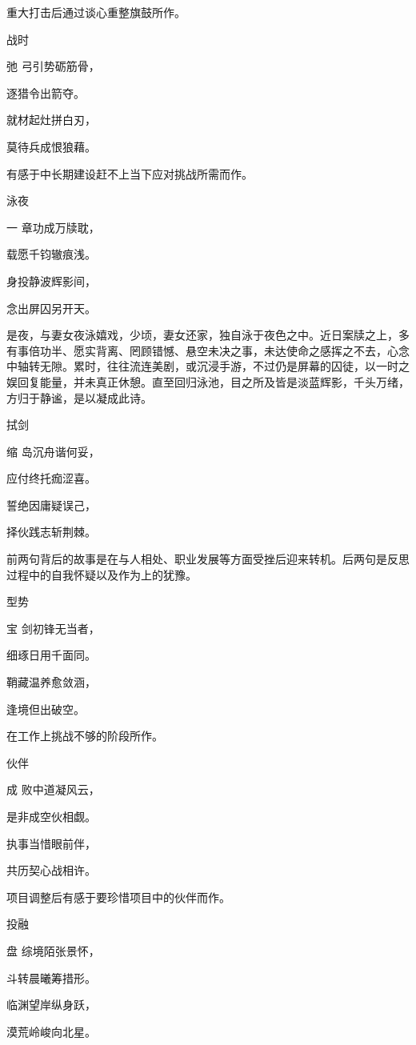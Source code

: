 \documentclass{article}
\newenvironment{poem}[3]{
\begin{minipage}{\textwidth}
\begin{pinyinscope}\begin{center}\Large\linespread{1.4}\selectfont #2\end{center}\end{pinyinscope}
\begin{pinyinscope}
	\begin{center}
	\Large\linespread{1.4}\rmfamily\selectfont #3
}{\end{center}
\end{pinyinscope}
\end{minipage}
}
\begin{document}
重大打击后通过谈心重整旗鼓所作。

\begin{poem}{}{战时}
弛弓引势砺筋骨，

逐猎令出箭夺{}。

就材起灶拼白刃，

莫待兵成恨狼藉。
\end{poem}

有感于中长期建设赶不上当下应对挑战所需而作。

\begin{poem}{}{泳夜}
一章功成万牍耽，

载愿千钧辙痕浅。

身投静波辉影间，

念出屏囚另开天。
\end{poem}

是夜，与妻女夜泳嬉戏，少顷，妻女还家，独自泳于夜色之中。近日案牍之上，多有事倍功半、愿实背离、罔顾错憾、悬空未决之事，未达使命之感挥之不去，心念中轴转无隙。累时，往往流连美剧，或沉浸手游，不过仍是屏幕的囚徒，以一时之娱回复能量，并未真正休憩。直至回归泳池，目之所及皆是淡蓝辉影，千头万绪，方归于静谧，是以凝成此诗。

\begin{poem}{}{拭剑}
缩岛沉舟谐何妥，

应付终托痂涩喜。

誓绝因庸疑误己，

择伙践志斩荆棘。
\end{poem}

前两句背后的故事是在与人相处、职业发展等方面受挫后迎来转机。后两句是反思过程中的自我怀疑以及作为上的犹豫。

\begin{poem}{}{型势}
宝剑初锋无当者，

细琢日用千面同。

鞘藏温养愈敛涵，

逢境但出破{}空。
\end{poem}

在工作上挑战不够的阶段所作。

\begin{poem}{}{伙伴}
成败中道凝风云，

是非成空伙相觑。

执事当惜眼前伴，

共历契心战相许。
\end{poem}

项目调整后有感于要珍惜项目中的伙伴而作。

\begin{poem}{}{投融}
盘综境陌张景怀，

斗转晨曦筹措形。

临渊望岸纵身跃，

漠荒岭峻向北星。
\end{poem}
\end{document}
